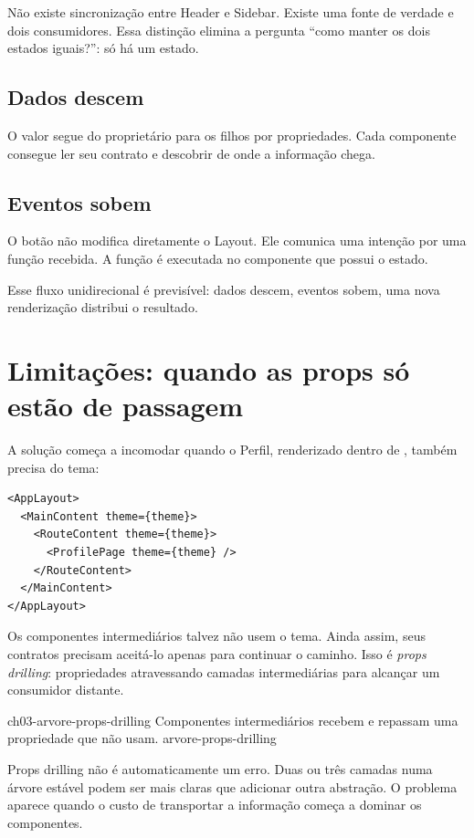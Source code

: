 Não existe sincronização entre Header e Sidebar. Existe uma fonte de verdade e
dois consumidores. Essa distinção elimina a pergunta ``como manter os dois
estados iguais?'': só há um estado.

\subsection{Dados descem}

O valor segue do proprietário para os filhos por propriedades. Cada componente
consegue ler seu contrato e descobrir de onde a informação chega.

\subsection{Eventos sobem}

O botão não modifica diretamente o Layout. Ele comunica uma intenção por uma
função recebida. A função é executada no componente que possui o estado.

Esse fluxo unidirecional é previsível: dados descem, eventos sobem, uma nova
renderização distribui o resultado.

\section{Limitações: quando as props só estão de passagem}

A solução começa a incomodar quando o Perfil, renderizado dentro de
, também precisa do tema:

\begin{lstlisting}
<AppLayout>
  <MainContent theme={theme}>
    <RouteContent theme={theme}>
      <ProfilePage theme={theme} />
    </RouteContent>
  </MainContent>
</AppLayout>
\end{lstlisting}

Os componentes intermediários talvez não usem o tema. Ainda assim, seus
contratos precisam aceitá-lo apenas para continuar o caminho. Isso é
\emph{props drilling}: propriedades atravessando camadas intermediárias para
alcançar um consumidor distante.

\imagemcapitulo
  {ch03-arvore-props-drilling}
  {Componentes intermediários recebem e repassam uma propriedade que não usam.}
  {arvore-props-drilling}

Props drilling não é automaticamente um erro. Duas ou três camadas numa árvore
estável podem ser mais claras que adicionar outra abstração. O problema aparece
quando o custo de transportar a informação começa a dominar os componentes.

